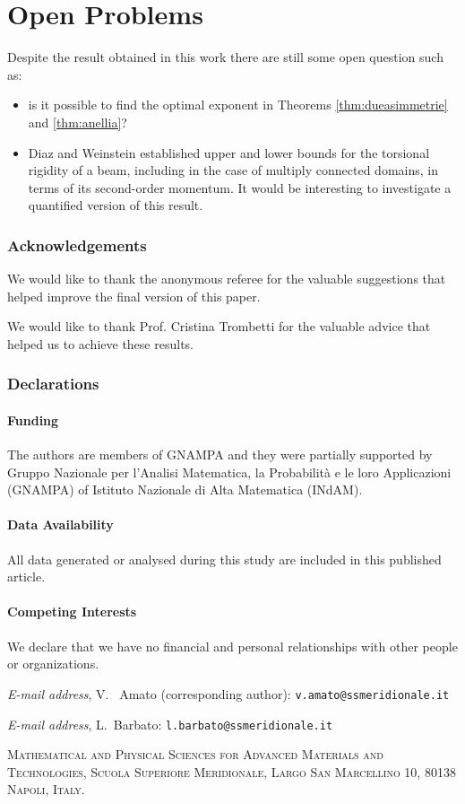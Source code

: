 \documentclass[oneside,a4paper,11pt,notitlepage]{article}
\makeatletter
\theoremstyle{definition}
\theoremstyle{plain}
\theoremstyle{definition}
\newcommand{\Addresses}{{%
\bigskip 
  \footnotesize 
 \textit{E-mail address}, V. ~Amato (corresponding author): \texttt{v.amato@ssmeridionale.it} 

     \medskip 

 \noindent \textit{E-mail address}, L.~Barbato: \texttt{l.barbato@ssmeridionale.it} 
  
   \medskip 
 
  \textsc{Mathematical and Physical Sciences for Advanced Materials and Technologies, Scuola Superiore Meridionale, Largo San Marcellino 10, 80138 Napoli, Italy. } 
 
 
 \par\nopagebreak 

}}
\makeatother
\begin{document}
\section{Open Problems}
\label{section7}

Despite the result obtained in this work there are still some open question such as:
\begin{itemize}
\item is it possible to find the optimal exponent in Theorems \ref{thm:dueasimmetrie} and \ref{thm:anellia}?
\item Diaz and Weinstein established upper and lower bounds for the torsional rigidity of a beam, including in the case of multiply connected domains, in terms of its second-order momentum. It would be interesting to investigate a quantified version of this result.
\end{itemize}





\subsubsection*{Acknowledgements}
We would like to thank the anonymous referee for the valuable suggestions that helped improve the final version of this paper.

We would like to thank Prof. Cristina Trombetti for the valuable advice that helped us to achieve these results.
\subsubsection*{Declarations}

\paragraph{Funding}
The authors are members of GNAMPA and they were partially supported by Gruppo Nazionale per l’Analisi Matematica, la Probabilità e le loro Applicazioni
(GNAMPA) of Istituto Nazionale di Alta Matematica (INdAM).   

\paragraph{Data Availability} All data generated or analysed during this study are included in this published article.
	
\paragraph{Competing Interests} We declare that we have no financial and personal relationships with other people or organizations.



\Addresses
\end{document}
